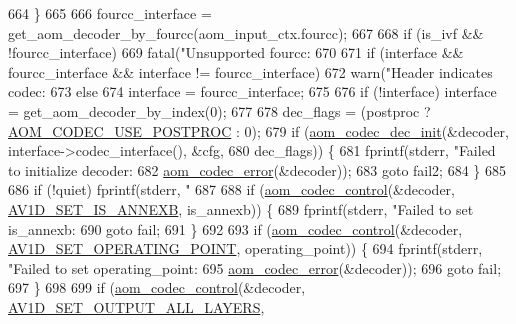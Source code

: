 \begin{DoxyCodeInclude}
{{{{{{{{{{{{{{{{{{{{{{{{{{{{{{664   \}
665 
666   fourcc\_interface = get\_aom\_decoder\_by\_fourcc(aom\_input\_ctx.fourcc);
667 
668   \textcolor{keywordflow}{if} (is\_ivf && !fourcc\_interface)
669     fatal(\textcolor{stringliteral}{"Unsupported fourcc: %
670 
671   \textcolor{keywordflow}{if} (interface && fourcc\_interface && interface != fourcc\_interface)
672     warn(\textcolor{stringliteral}{"Header indicates codec: %
673   \textcolor{keywordflow}{else}
674     \textcolor{keyword}{interface }= fourcc\_interface;
675 
676   \textcolor{keywordflow}{if} (!interface) \textcolor{keyword}{interface }= get\_aom\_decoder\_by\_index(0);
677 
678   dec\_flags = (postproc ? \hyperlink{group__decoder_ga7b6c145833964c9edd3ff78be017f7ec}{AOM\_CODEC\_USE\_POSTPROC} : 0);
679   \textcolor{keywordflow}{if} (\hyperlink{group__decoder_gafdbfca65b19ab1f6d72b32cd01753b9b}{aom\_codec\_dec\_init}(&decoder, interface->codec\_interface(), &cfg,
680                          dec\_flags)) \{
681     fprintf(stderr, \textcolor{stringliteral}{"Failed to initialize decoder: %
682             \hyperlink{group__codec_ga50949c0854605c722832bbfb0803f5f4}{aom\_codec\_error}(&decoder));
683     \textcolor{keywordflow}{goto} fail2;
684   \}
685 
686   \textcolor{keywordflow}{if} (!quiet) fprintf(stderr, \textcolor{stringliteral}{"%
687 
688   \textcolor{keywordflow}{if} (\hyperlink{group__codec_ga6da974f4eeaba1fa74106b28d0fe6ac5}{aom\_codec\_control}(&decoder, \hyperlink{group__aom__decoder_gga3865fd4b3192489baa9a5c3632ebe97ba1fb269c5c5913d9995b6c35d28e2a788}{AV1D\_SET\_IS\_ANNEXB}, is\_annexb)) \{
689     fprintf(stderr, \textcolor{stringliteral}{"Failed to set is\_annexb: %
690     \textcolor{keywordflow}{goto} fail;
691   \}
692 
693   \textcolor{keywordflow}{if} (\hyperlink{group__codec_ga6da974f4eeaba1fa74106b28d0fe6ac5}{aom\_codec\_control}(&decoder, \hyperlink{group__aom__decoder_gga3865fd4b3192489baa9a5c3632ebe97baa8b955fc5a2f6e33c6dad858d7c15f67}{AV1D\_SET\_OPERATING\_POINT}, 
      operating\_point)) \{
694     fprintf(stderr, \textcolor{stringliteral}{"Failed to set operating\_point: %
695             \hyperlink{group__codec_ga50949c0854605c722832bbfb0803f5f4}{aom\_codec\_error}(&decoder));
696     \textcolor{keywordflow}{goto} fail;
697   \}
698 
699   \textcolor{keywordflow}{if} (\hyperlink{group__codec_ga6da974f4eeaba1fa74106b28d0fe6ac5}{aom\_codec\_control}(&decoder, \hyperlink{group__aom__decoder_gga3865fd4b3192489baa9a5c3632ebe97ba8d51f96b8877b665225f5cfaa73ded8e}{AV1D\_SET\_OUTPUT\_ALL\_LAYERS},
}}}}}}}}}}}}}}}}}}}}}}}}}}}}}}}}}}}}
\end{DoxyCodeInclude}
